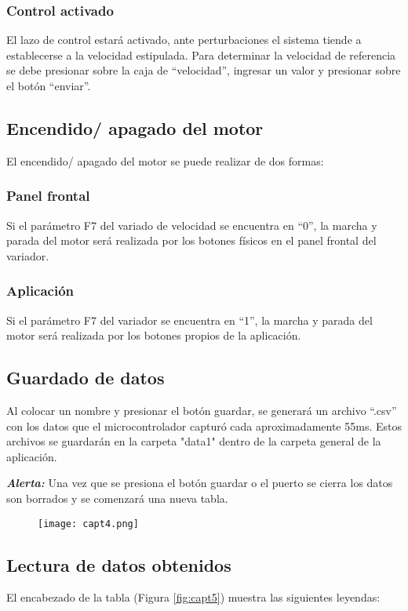 \subsubsection{Control activado}
El lazo de control estará activado, ante perturbaciones el sistema tiende a establecerse a la velocidad estipulada. Para determinar la velocidad de referencia se debe presionar sobre la caja de “velocidad”, ingresar un valor y presionar sobre el botón “enviar”.

\subsection{Encendido/ apagado del motor}
El encendido/ apagado del motor se puede realizar de dos formas:
\subsubsection{Panel frontal}
Si el parámetro F7 del variado de velocidad se encuentra en “0”, la marcha y parada del motor será realizada por los botones físicos en el panel frontal del variador.
\subsubsection{Aplicación}
Si el parámetro F7 del variador se encuentra en “1”, la marcha y parada del motor será realizada por los botones propios de la aplicación.


\subsection{Guardado de datos}
Al colocar un nombre y presionar el botón guardar, se generará un archivo “.csv” con los datos que el microcontrolador capturó cada aproximadamente 55ms. Estos archivos se guardarán en la carpeta "data1{}"  dentro de la carpeta general de la aplicación. 

\textbf{\textit{Alerta:}} Una vez que se presiona el botón guardar o el puerto se cierra los datos son borrados y se comenzará una nueva tabla.

\begin{figure}[H]
	\centering
	\texttt{[image: capt4.png]}
	\label{fig:capt4}
\end{figure}


\subsection{Lectura de datos obtenidos}
El encabezado de la tabla (Figura \ref{fig:capt5}) muestra las siguientes leyendas:

